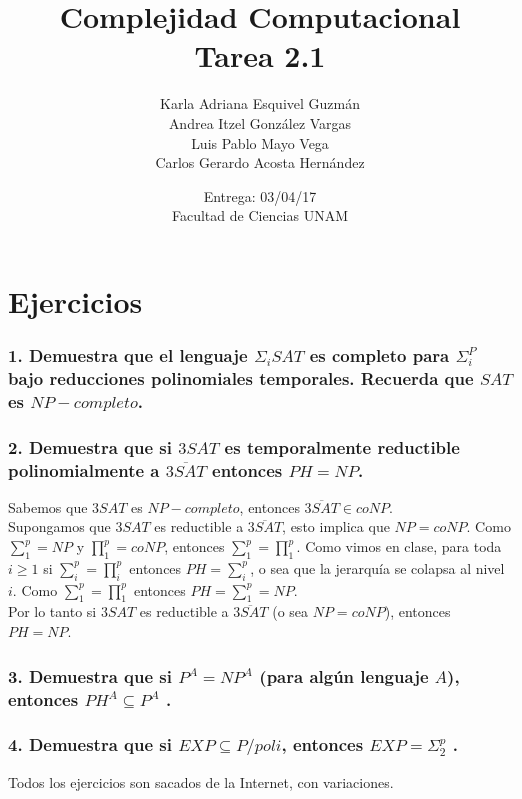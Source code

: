 \documentclass[12pt]{article}
\title{Complejidad Computacional \\ Tarea 2.1}
\author{Karla Adriana Esquivel Guzmán \\ Andrea Itzel González Vargas\\ Luis Pablo Mayo Vega \\ Carlos Gerardo Acosta Hernández}
\date{Entrega: 03/04/17 \\ Facultad de Ciencias UNAM}
\begin{document}
\maketitle
\section*{Ejercicios}
\subsubsection*{1. Demuestra que el lenguaje $\Sigma_iSAT$ es completo para $\Sigma^P_i$ bajo reducciones polinomiales
temporales. Recuerda que $SAT$ es $NP-completo$.}
\subsubsection*{2. Demuestra que si $3SAT$ es temporalmente reductible polinomialmente a $\overline{3SAT}$ entonces $PH = NP$.}
Sabemos que $3SAT$ es $NP-completo$, entonces $\overline{3SAT} \in coNP$. \\
Supongamos que $3SAT$ es reductible a $\overline{3SAT}$, esto implica que $NP = coNP$. Como $\sum_1^p = NP$ y $\prod_1^p = coNP$, entonces $\sum_1^p = \prod_1^p$. Como vimos en clase, para toda $i \geq 1$ si $\sum_i^p = \prod_i^p$ entonces $PH = \sum_i^p$, o sea que la jerarquía se colapsa al nivel $i$. Como $\sum_1^p = \prod_1^p$ entonces $PH = \sum_1^p = NP$. \\
Por lo tanto si $3SAT$ es reductible a $\overline{3SAT}$ (o sea $NP = coNP$), entonces $PH = NP$.

\subsubsection*{3. Demuestra que si $P^A = NP^A$ (para algún lenguaje $A$), entonces $PH^A \subseteq P^A$ .}
\subsubsection*{4. Demuestra que si $EXP \subseteq P/poli$, entonces $EXP = \Sigma^p_2$ .}

Todos los ejercicios son sacados de la Internet, con variaciones.
\end{document}
